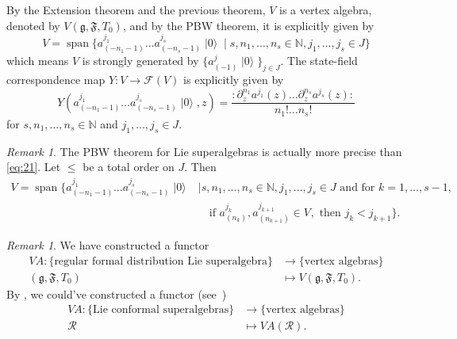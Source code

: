 \documentclass[a4paper, 12pt, reqno]{amsart}
\theoremstyle{remark}
\newtheorem{remark}[theorem]{Remark}
\numberwithin{equation}{subsection}
\DeclareMathOperator{\vspan}{span}
\DeclareMathOperator{\vac}{|0\rangle}
\DeclareMathOperator{\one}{\overline{1}}
\begin{document}
By the Extension theorem and the previous theorem, $V$ is a vertex algebra, denoted by $V(\mathfrak{g}, \mathfrak{F}, T_0)$, and by the PBW theorem, it is explicitly given by
\begin{equation}
  \label{eq:21}
  V = \vspan\{a^{j_1}_{(-n_1 - 1)}\dots a^{j_s}_{(-n_s - 1)}\vac \mid s, n_1, \dots, n_s \in \mathbb{N}, j_1, \dots, j_s \in J\}
\end{equation}
which means $V$ is strongly generated by $\{a^j_{(-1)}\vac\}_{j\in J}$.
The state-field correspondence map $Y: V \to \mathcal{F}(V)$ is explicitly given by
\begin{equation}
  \label{eq:22}
  Y(a^{j_1}_{(-n_1 - 1)}\dots a^{j_s}_{(-n_s - 1)}\vac, z) = \frac{:\partial^{n_1}_za^{j_1}(z)\dots \partial^{n_s}_za^{j_s}(z):}{n_1!\dots n_s!}
\end{equation}
for $s, n_1, \dots, n_s \in \mathbb{N}$ and $j_1, \dots, j_s \in J$.

\begin{remark}
  \label{rmk:12}
  The PBW theorem for Lie superalgebras is actually more precise than \eqref{eq:21}.
  Let $\le$ be a total order on $J$.
  Then
  \begin{equation*}
    \begin{split}
      V = \vspan\{a^{j_1}_{(-n_1 - 1)}\dots a^{j_s}_{(-n_s - 1)}\vac &\mid s, n_1, \dots, n_s \in \mathbb{N}, j_1, \dots, j_s \in J\text{ and for } k = 1, \dots, s - 1,\\
      &\quad \text{if }a^{j_k}_{(n_k)},a^{j_{k + 1}}_{(n_{k + 1})}\in V_{\one},\text{ then }j_k < j_{k + 1}\}.
    \end{split}
  \end{equation*}
\end{remark}

\begin{remark}
  \label{rmk:13}
  We have constructed a functor
  \begin{align*}
    VA: \{\text{regular formal distribution Lie superalgebra}\} &\to \{\text{vertex algebras}\} \\
    (\mathfrak{g}, \mathfrak{F}, T_0) &\mapsto V(\mathfrak{g}, \mathfrak{F}, T_0).
  \end{align*}
  By , we could've constructed a functor (see~\cite[Theorem 2.15]{li_vertex_2004})
  \begin{align*}
    VA: \{\text{Lie conformal superalgebras}\} &\to \{\text{vertex algebras}\} \\
    \mathcal{R} &\mapsto VA(\mathcal{R}).
  \end{align*}
\end{remark}
\end{document}
